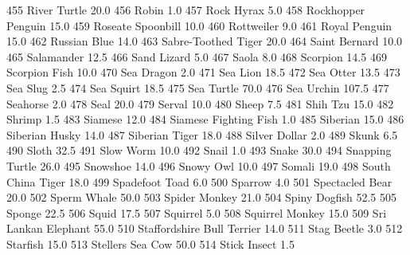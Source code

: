 \documentclass[a4paper]{article}
\begin{document}
\begin{Schunk}
\begin{Soutput}
455                   River Turtle     20.0
456                          Robin      1.0
457                     Rock Hyrax      5.0
458             Rockhopper Penguin     15.0
459              Roseate Spoonbill     10.0
460                     Rottweiler      9.0
461                  Royal Penguin     15.0
462                   Russian Blue     14.0
463            Sabre-Toothed Tiger     20.0
464                  Saint Bernard     10.0
465                     Salamander     12.5
466                    Sand Lizard      5.0
467                          Saola      8.0
468                       Scorpion     14.5
469                  Scorpion Fish     10.0
470                     Sea Dragon      2.0
471                       Sea Lion     18.5
472                      Sea Otter     13.5
473                       Sea Slug      2.5
474                     Sea Squirt     18.5
475                     Sea Turtle     70.0
476                     Sea Urchin    107.5
477                       Seahorse      2.0
478                           Seal     20.0
479                         Serval     10.0
480                          Sheep      7.5
481                       Shih Tzu     15.0
482                         Shrimp      1.5
483                        Siamese     12.0
484          Siamese Fighting Fish      1.0
485                       Siberian     15.0
486                 Siberian Husky     14.0
487                 Siberian Tiger     18.0
488                  Silver Dollar      2.0
489                          Skunk      6.5
490                          Sloth     32.5
491                      Slow Worm     10.0
492                          Snail      1.0
493                          Snake     30.0
494                Snapping Turtle     26.0
495                       Snowshoe     14.0
496                      Snowy Owl     10.0
497                         Somali     19.0
498              South China Tiger     18.0
499                 Spadefoot Toad      6.0
500                        Sparrow      4.0
501                Spectacled Bear     20.0
502                    Sperm Whale     50.0
503                  Spider Monkey     21.0
504                  Spiny Dogfish     52.5
505                         Sponge     22.5
506                          Squid     17.5
507                       Squirrel      5.0
508                Squirrel Monkey     15.0
509            Sri Lankan Elephant     55.0
510     Staffordshire Bull Terrier     14.0
511                    Stag Beetle      3.0
512                       Starfish     15.0
513               Stellers Sea Cow     50.0
514                   Stick Insect      1.5

\end{Soutput}
\end{Schunk}
\end{document}
